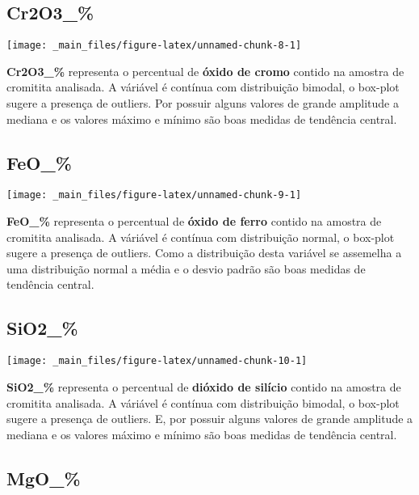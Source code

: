 \documentclass[
]{article}
\begin{document}
\hypertarget{cr2o3_}{%
\subsection{Cr2O3\_\%}\label{cr2o3_}}

\begin{center}\texttt{[image: \_main\_files/figure-latex/unnamed-chunk-8-1]} \end{center}

\textbf{Cr2O3\_\%} representa o percentual de \textbf{óxido de cromo} contido na amostra de cromitita analisada. A váriável é contínua com distribuição bimodal, o box-plot sugere a presença de outliers. Por possuir alguns valores de grande amplitude a mediana e os valores máximo e mínimo são boas medidas de tendência central.

\hypertarget{feo_}{%
\subsection{FeO\_\%}\label{feo_}}

\begin{center}\texttt{[image: \_main\_files/figure-latex/unnamed-chunk-9-1]} \end{center}

\textbf{FeO\_\%} representa o percentual de \textbf{óxido de ferro} contido na amostra de cromitita analisada. A váriável é contínua com distribuição normal, o box-plot sugere a presença de outliers. Como a distribuição desta variável se assemelha a uma distribuição normal a média e o desvio padrão são boas medidas de tendência central.

\hypertarget{sio2_}{%
\subsection{SiO2\_\%}\label{sio2_}}

\begin{center}\texttt{[image: \_main\_files/figure-latex/unnamed-chunk-10-1]} \end{center}

\textbf{SiO2\_\%} representa o percentual de \textbf{dióxido de silício} contido na amostra de cromitita analisada. A váriável é contínua com distribuição bimodal, o box-plot sugere a presença de outliers. E, por possuir alguns valores de grande amplitude a mediana e os valores máximo e mínimo são boas medidas de tendência central.

\hypertarget{mgo_}{%
\subsection{MgO\_\%}\label{mgo_}}
\end{document}
